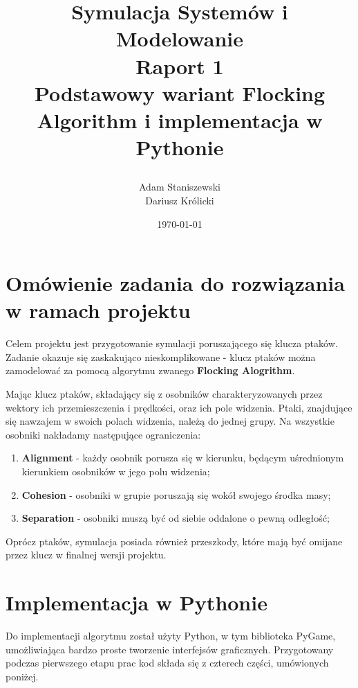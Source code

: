 \documentclass[12pt,a4paper,table]{article}
\begin{document}
    \title {
        Symulacja Systemów i Modelowanie \\
        Raport 1 \\
        Podstawowy wariant Flocking Algorithm i implementacja w Pythonie

    }

    \author{
        Adam Staniszewski \\
        Dariusz Królicki
    }

    \date{\today}

    \maketitle

    \tableofcontents
    \newpage

    \section{Omówienie zadania do rozwiązania w ramach projektu}
    Celem projektu jest przygotowanie symulacji poruszającego się klucza ptaków. Zadanie okazuje się zaskakująco nieskomplikowane - klucz ptaków można zamodelować za pomocą algorytmu zwanego \textbf{Flocking Alogrithm}.

    Mając klucz ptaków, składający się z osobników charakteryzowanych przez wektory ich przemieszczenia i prędkości, oraz ich pole widzenia. Ptaki, znajdujące się nawzajem w swoich polach widzenia, należą do jednej grupy. Na wszystkie osobniki nakładamy następujące ograniczenia:
    \begin{enumerate}
        \item \textbf{Alignment} - każdy osobnik porusza się w kierunku, będącym uśrednionym kierunkiem osobników w jego polu widzenia;
        \item \textbf{Cohesion} - osobniki w grupie poruszają się wokół swojego środka masy;
        \item \textbf{Separation} - osobniki muszą być od siebie oddalone o pewną odległość;
    \end{enumerate}

    Oprócz ptaków, symulacja posiada również przeszkody, które mają być omijane przez klucz w finalnej wersji projektu.
    
    \section{Implementacja w Pythonie}
    Do implementacji algorytmu został użyty Python, w tym biblioteka PyGame, umożliwiająca bardzo proste tworzenie interfejsów graficznych. Przygotowany podczas pierwszego etapu prac kod składa się z czterech części, umówionych poniżej.
\end{document}
